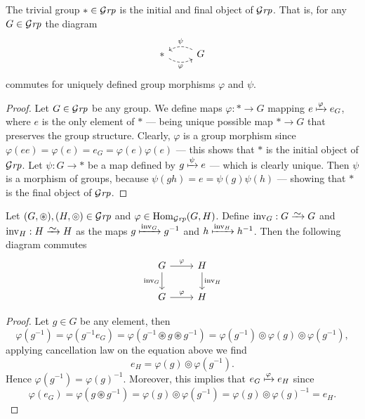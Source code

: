 \begin{proposition}
  The trivial group \(* \in {\mathcal{G}\textit{rp}}\) is the initial and final object of \({\mathcal{G}\textit{rp}}\).
  That is, for any \(G \in {\mathcal{G}\textit{rp}}\) the diagram
  \[
    \begin{tikzcd}
      * \ar[r, dashed, bend right, swap, "\varphi"]
      &G \ar[l, dashed, bend right, swap, "\psi"]
    \end{tikzcd}
  \]
  commutes for uniquely defined group morphisms \(\varphi\) and \(\psi\).
\end{proposition}

\begin{proof}
  Let \(G \in {\mathcal{G}\textit{rp}}\) be any group. We define maps \(\varphi: * \to G\) mapping
  \(e \xmapsto\varphi e_G\), where \(e\) is the only element of \(*\) --- being
  unique possible map \(* \to G\) that preserves the group structure. Clearly,
  \(\varphi\) is a group morphism since \(\varphi(e e) = \varphi(e) = e_G =
  \varphi(e) \varphi(e)\) --- this shows that \(*\) is the initial object of
  \({\mathcal{G}\textit{rp}}\). Let \(\psi: G \to *\) be a map defined by \(g \xmapsto\psi e\) ---
  which is clearly unique. Then \(\psi\) is a morphism of groups, because
  \(\psi(g h) = e = \psi(g) \psi(h)\) --- showing that \(*\) is the final object
  of \({\mathcal{G}\textit{rp}}\).
\end{proof}

\begin{proposition}
  Let \((G, \circledast), (H, \circledcirc) \in {\mathcal{G}\textit{rp}}\) and \(\varphi \in
  \operatorname{Hom}_{\mathcal{G}\textit{rp}}(G, H)\). Define \(\operatorname{inv}_G: G \isoto G\) and
  \(\operatorname{inv}_H: H \isoto H\) as the maps \(g \xmapsto
  {\operatorname{inv}_G} g^{-1}\) and \(h \xmapsto {\operatorname{inv}_H}
  h^{-1}\). Then the following diagram commutes
  \[
    \begin{tikzcd}
      G \ar[r, "\varphi"]
      \ar[d, swap, "\operatorname{inv}_G"]
      &H \ar[d, "\operatorname{inv}_H"] \\
      G \ar[r, "\varphi"] &H
    \end{tikzcd}
  \]
\end{proposition}

\begin{proof}
  Let \(g \in G\) be any element, then
  \[
    \varphi(g^{-1}) = \varphi(g^{-1} e_G) = \varphi(g^{-1} \circledast g
    \circledast g^{-1}) = \varphi(g^{-1}) \circledcirc \varphi(g) \circledcirc
    \varphi(g^{-1}),
  \]
  applying cancellation law on the equation above we find
  \[
    e_H = \varphi(g) \circledcirc \varphi(g^{-1}).
  \]
  Hence \(\varphi(g^{-1}) = \varphi(g)^{-1}\). Moreover, this implies that \(e_G
  \xmapsto \varphi e_H\) since
  \[
    \varphi(e_G) = \varphi(g \circledast g^{-1}) = \varphi(g) \circledcirc
    \varphi(g^{-1}) = \varphi(g) \circledcirc \varphi(g)^{-1} = e_H.
  \]
\end{proof}

